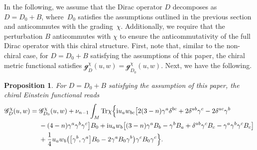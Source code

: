 \documentclass[10pt,a4paper]{amsart}
\numberwithin{equation}{section}
\newtheorem{Proposition}[Theorem]{Proposition}
\theoremstyle{definition}
\def\Tr{\mathrm{Tr}}
\begin{document}
In the following, we assume that the Dirac operator $D$ decomposes as $D=D_0+B$, where~$D_0$ satisfies the assumptions outlined in the previous section and anticommutes with the grading~$\chi$. Additionally, we require that the perturbation $B$ anticommutes with $\chi$ to ensure the anticommutativity of the full Dirac operator with this chiral structure. First, note that, similar to the non-chiral case, for $D=D_0+B$ satisfying the assumptions of this paper, the chiral metric functional satisfies $\mathscr{g}^\chi_D(u,w) = \mathscr{g}^\chi_{D_0}(u,w)$. Next, we have the following.


\begin{Proposition}
	\label{prop:Einchi}
	For $D = D_0+B$ satisfying the assumption of this paper, the chiral Einstein functional reads
		\begin{align*}
			\mathscr{G}_D^\chi(u,w)={}& \mathscr{G}_{D_0}^\chi(u,w)
 + \nu_{n-1}\int_M\Tr \chi\Bigr\{
 {\rm i}u_a w_{bc}\bigl[2(3-n)\gamma^a \delta^{bc}+2\delta^{ab} \gamma^c -2\delta^{ac} \gamma^b \\
 &-(4-n)\gamma^a\gamma^b\gamma^c\bigr]B_0+{\rm i}u_a w_b \bigl[(3-n)\gamma^a B_b -\gamma^b B_a +\delta^{ab}\gamma^c B_c - \gamma^a\gamma^b\gamma^c B_c\bigr]\\
 & +\frac{1}{4}u_aw_b \bigl(\bigl[\gamma^b,\gamma^a\bigr] B_0 -2\gamma^a B_0 \gamma^b\bigr)\gamma^c B_0 \gamma^c
 \Bigr\}.
		\end{align*}
\end{Proposition}
\end{document}
